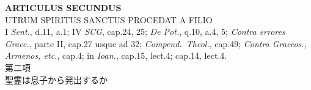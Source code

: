 \documentclass[paper=a4paper,fontsize=10pt,jafontsize=9pt,titlepage]{jlreq}
\begin{document}
\begin{center}
{\Large {\bfseries ARTICULUS SECUNDUS}}\\
{\large UTRUM SPIRITUS SANCTUS PROCEDAT A FILIO}\\
{\footnotesize I {\itshape Sent.}, d.11, a.1; IV {\itshape SCG},
 cap.24, 25; {\itshape De Pot.}, q.10, a.4, 5; {\itshape Contra
 errores Graec.}, parte II, cap.27 usque ad 32; {\itshape
 Compend.~Theol.}, cap.49; {\itshape Contra Graecos., Armenos, etc.},
 cap.4; in {\itshape Ioan.}, cap.15, lect.4; cap.14, lect.4.}\\
{\Large 第二項\\聖霊は息子から発出するか}
\end{center}


{}
\setcounter{section}{2}
\setcounter{subsection}{0}
\end{document}
